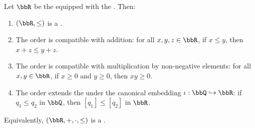 \begin{proposition} \label{proposition:the_field_of_real_numbers_is_a_totally_ordered_field}
    Let $\bbR$ be the  equipped with the . Then:
    \begin{enumerate}
        \item $(\bbR, \le)$ is a .
        \item The order is compatible with addition: for all $x, y, z \in \bbR$, if $x \le y$, then $x + z \le y + z$.
        \item The order is compatible with multiplication by non-negative elements: for all $x, y \in \bbR$, if $x \ge 0$ and $y \ge 0$, then $xy \ge 0$.
        \item The order extends the  under the canonical embedding $\iota: \bbQ \hookrightarrow \bbR$: if $q_1 \le q_2$ in $\bbQ$, then $[q_1] \le [q_2]$ in $\bbR$.
    \end{enumerate}
    Equivalently, $(\bbR, +, \cdot, \le)$ is a .
\end{proposition}

